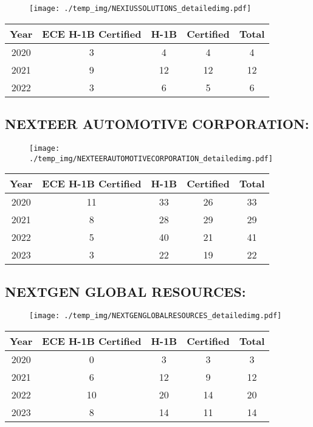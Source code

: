 \documentclass{article}%
\begin{document}
\begin{figure}[htbp]%
\centering%
\texttt{[image: ./temp\_img/NEXIUSSOLUTIONS\_detailedimg.pdf]}%
\end{figure}

%
\begin{longtable}{c|c|c|c|c}%
\hline%
Year&ECE H{-}1B Certified&H{-}1B&Certified&Total\\%
\hline%
2020&3&4&4&4\\%
\hline%
2021&9&12&12&12\\%
\hline%
2022&3&6&5&6\\%
\hline%
\end{longtable}

%
\newpage%
\subsection{NEXTEER AUTOMOTIVE CORPORATION:}%
\label{subsec:NEXTEERAUTOMOTIVECORPORATION}%
\label{NEXTEERAUTOMOTIVECORPORATIONdetailed}%


\begin{figure}[htbp]%
\centering%
\texttt{[image: ./temp\_img/NEXTEERAUTOMOTIVECORPORATION\_detailedimg.pdf]}%
\end{figure}

%
\begin{longtable}{c|c|c|c|c}%
\hline%
Year&ECE H{-}1B Certified&H{-}1B&Certified&Total\\%
\hline%
2020&11&33&26&33\\%
\hline%
2021&8&28&29&29\\%
\hline%
2022&5&40&21&41\\%
\hline%
2023&3&22&19&22\\%
\hline%
\end{longtable}

%
\newpage%
\subsection{NEXTGEN GLOBAL RESOURCES:}%
\label{subsec:NEXTGENGLOBALRESOURCES}%
\label{NEXTGENGLOBALRESOURCESdetailed}%


\begin{figure}[htbp]%
\centering%
\texttt{[image: ./temp\_img/NEXTGENGLOBALRESOURCES\_detailedimg.pdf]}%
\end{figure}

%
\begin{longtable}{c|c|c|c|c}%
\hline%
Year&ECE H{-}1B Certified&H{-}1B&Certified&Total\\%
\hline%
2020&0&3&3&3\\%
\hline%
2021&6&12&9&12\\%
\hline%
2022&10&20&14&20\\%
\hline%
2023&8&14&11&14\\%
\hline%
\end{longtable}
\end{document}
